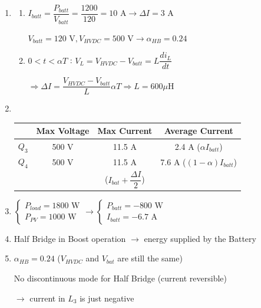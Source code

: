 \begin{enumerate}
    \item \begin{enumerate}
        \item $I_{batt} = \dfrac{P_{batt}}{V_{batt}}=\dfrac{1200}{120} = 10\text{ A} \rightarrow \Delta I = 3\text{ A}$
        
        $V_{batt} = 120\text{ V}, V_{HVDC} = 500 \text{ V} \rightarrow \alpha_{HB} = 0.24$
        \item \underline{$0 < t < \alpha T$} : $V_{L}= V_{HVDC} - V_{batt} = L \dfrac{di_L}{dt}$ 
        
        $\Rightarrow \Delta I = \dfrac{V_{HVDC}-V_{batt}}{L} \alpha T \Rightarrow L = 600 \mu\text{H}$
    \end{enumerate}

    \item \ 
    
    \begin{tabular}{|c|c|c|c|}
        \hline
        & Max Voltage & Max Current & Average Current \\
        \hline
        $Q_3$ & 500 V & 11.5 A & 2.4 A ($\alpha I_{batt}$) \\
        \hline
        $Q_4$ & 500 V & 11.5 A & 7.6 A ($(1-\alpha)I_{batt}$)\\
        \hline
        \multicolumn{2}{c}{} &  \multicolumn{1}{c}{($I_{bat} + \dfrac{\Delta I}{2}$)} & \multicolumn{1}{c}{}
    \end{tabular}

    \item $\left\{\begin{array}{l}P_{load} = 1800 \text{ W}\\ P_{PV}=1000\text{ W}\end{array}\right. \rightarrow \left\{\begin{array}{l}P_{batt}=-800 \text{ W}\\
        I_{batt} = -6.7\text{ A}\end{array}\right.$

    \item Half Bridge in Boost operation $\rightarrow$ energy supplied by the Battery
    \item $\alpha_{HB}=0.24$ ($V_{HVDC}$ and $V_{bat}$ are still the same)
    
    No discontinuous mode for Half Bridge (current reversible)

    $\rightarrow$ current in $L_3$ is just negative


\end{enumerate}

